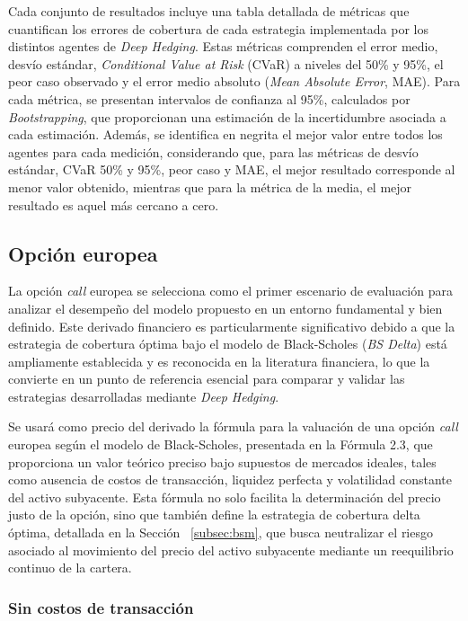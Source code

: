 \documentclass[11pt,a4paper,spanish]{article}
\numberwithin{equation}{section} %
\begin{document}
Cada conjunto de resultados incluye una tabla detallada de métricas que cuantifican los errores de cobertura de cada estrategia implementada por los distintos agentes de \textit{Deep Hedging}. Estas métricas comprenden el error medio, desvío estándar, \textit{Conditional Value at Risk} (CVaR) a niveles del 50\% y 95\%, el peor caso observado y el error medio absoluto (\textit{Mean Absolute Error}, MAE). Para cada métrica, se presentan intervalos de confianza al 95\%, calculados por \textit{Bootstrapping}, que proporcionan una estimación de la incertidumbre asociada a cada estimación. Además, se identifica en negrita el mejor valor entre todos los agentes para cada medición, considerando que, para las métricas de desvío estándar, CVaR 50\% y 95\%, peor caso y MAE, el mejor resultado corresponde al menor valor obtenido, mientras que para la métrica de la media, el mejor resultado es aquel más cercano a cero.


\subsection{Opción europea}

La opción \textit{call} europea se selecciona como el primer escenario de evaluación para analizar el desempeño del modelo propuesto en un entorno fundamental y bien definido. Este derivado financiero es particularmente significativo debido a que la estrategia de cobertura óptima bajo el modelo de Black-Scholes (\textit{BS Delta}) está ampliamente establecida y es reconocida en la literatura financiera, lo que la convierte en un punto de referencia esencial para comparar y validar las estrategias desarrolladas mediante \textit{Deep Hedging}.

Se usará como precio del derivado la fórmula para la valuación de una opción \textit{call} europea según el modelo de Black-Scholes, presentada en la Fórmula 2.3, que proporciona un valor teórico preciso bajo supuestos de mercados ideales, tales como ausencia de costos de transacción, liquidez perfecta y volatilidad constante del activo subyacente. Esta fórmula no solo facilita la determinación del precio justo de la opción, sino que también define la estrategia de cobertura delta óptima, detallada en la Sección  ~\ref{subsec:bsm}, que busca neutralizar el riesgo asociado al movimiento del precio del activo subyacente mediante un reequilibrio continuo de la cartera.


\subsubsection{Sin costos de transacción}
\end{document}
